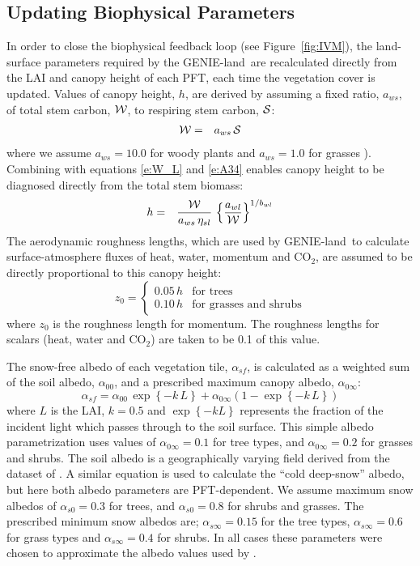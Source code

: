 \documentclass[a4paper]{article}
\newcommand{\gnl}{GENIE-land}
\begin{document}
\subsection{Updating Biophysical Parameters} \label{s:sparm}
In order to close the biophysical feedback loop (see
Figure~\ref{fig:IVM}), the land-surface parameters required by the
\gnl\ are recalculated directly from the LAI and canopy height of each
PFT, each time the vegetation cover is updated.  Values of canopy
height, $h$, are derived by assuming a fixed ratio, $a_{ws}$, of total
stem carbon, ${\cal W}$, to respiring stem carbon, ${\cal S}$:
\begin{eqnarray}
{\cal W} &=& a_{ws} \, {\cal S}
\end{eqnarray}
where we assume $a_{ws}=10.0$ for woody plants and $a_{ws}=1.0$ for
grasses \citep{Fri93}).  Combining with equations \eqref{e:W_L} and
\eqref{e:A34} enables canopy height to be diagnosed directly from the
total stem biomass:
\begin{eqnarray}
h &=& \frac{{\cal W}}{a_{ws} \, \eta_{sl}} \, \left\{\frac{a_{wl}}{{\cal W}}\right\}^{1/b_{wl}}
\end{eqnarray}
The aerodynamic roughness lengths, which are used by \gnl\ to
calculate surface-atmosphere fluxes of heat, water, momentum and
CO$_{2}$, are assumed to be directly proportional to this canopy
height:
\begin{equation}
z_0 = \left \{ \begin{array}{lll}
         0.05 \, h & \mbox{for trees}   \\ [2mm] 
         0.10 \, h & \mbox{for grasses and shrubs}  
\end{array}
\right.
\label{e:z0}
\end{equation}
where $z_0$ is the roughness length for momentum. The roughness
lengths for scalars (heat, water and CO$_{2}$) are taken to be 0.1 of
this value.

The snow-free albedo of each vegetation tile, $\alpha_{sf}$, is
calculated as a weighted sum of the soil albedo, $\alpha_00$, and a
prescribed maximum canopy albedo, $\alpha_{0\infty}$:
\begin{equation}
\alpha_{sf} = \alpha_{00} \, \exp \left\{-k \, L \right\} + \alpha_{0 \infty} \left(1- \exp \left\{-k \, L \right\} \right)
\label{e:albedo}
\end{equation}
where $L$ is the LAI, $k=0.5$ and $\exp \left\{-k L \right\}$
represents the fraction of the incident light which passes through to
the soil surface.  This simple albedo parametrization uses values of
$\alpha_{0 \infty}=0.1$ for tree types, and $\alpha_{0 \infty}=0.2$
for grasses and shrubs. The soil albedo is a geographically varying
field derived from the dataset of \citet{Wil85}.  A similar equation
is used to calculate the ``cold deep-snow'' albedo, but here both
albedo parameters are PFT-dependent. We assume maximum snow albedos of
$\alpha_{s0}=0.3$ for trees, and $\alpha_{s0}=0.8$ for shrubs and
grasses.  The prescribed minimum snow albedos are; $\alpha_{s
\infty}=0.15$ for the tree types, $\alpha_{s \infty}=0.6$ for grass
types and $\alpha_{s \infty}=0.4$ for shrubs.  In all cases these
parameters were chosen to approximate the albedo values used by
\citet{Cox99}.
\end{document}
